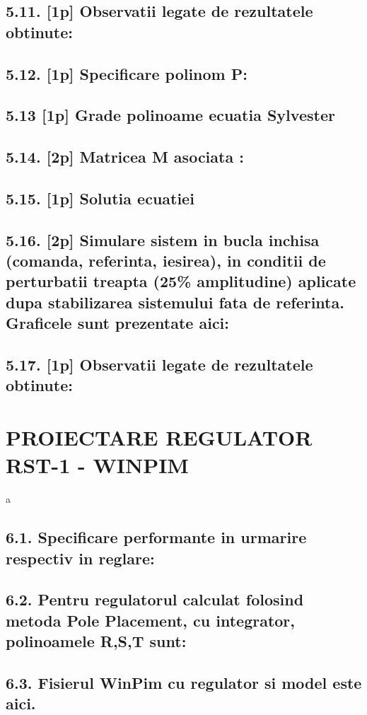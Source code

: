 \documentclass[12pt,english]{article}
\begin{document}
\subsection {5.11. [1p] Observatii legate de rezultatele obtinute: }
\subsection {5.12. [1p] Specificare polinom P: }
\subsection {5.13 [1p] Grade polinoame ecuatia Sylvester }
\subsection {5.14. [2p]  Matricea M asociata : }
\subsection {5.15. [1p] Solutia ecuatiei}
\subsection {5.16. [2p]  Simulare sistem in bucla inchisa (comanda, referinta, iesirea), in conditii de perturbatii treapta (25\% amplitudine) aplicate dupa stabilizarea sistemului fata de referinta. Graficele sunt prezentate aici: }
\subsection {5.17. [1p] Observatii legate de rezultatele obtinute: }

\section { PROIECTARE REGULATOR RST-1 - WINPIM }
a
\subsection {6.1. Specificare performante in urmarire respectiv in reglare: }
\subsection {6.2. Pentru regulatorul calculat folosind metoda Pole Placement, cu integrator, polinoamele R,S,T sunt: }
\subsection {6.3. Fisierul WinPim cu regulator si model este aici. }
\end{document}
